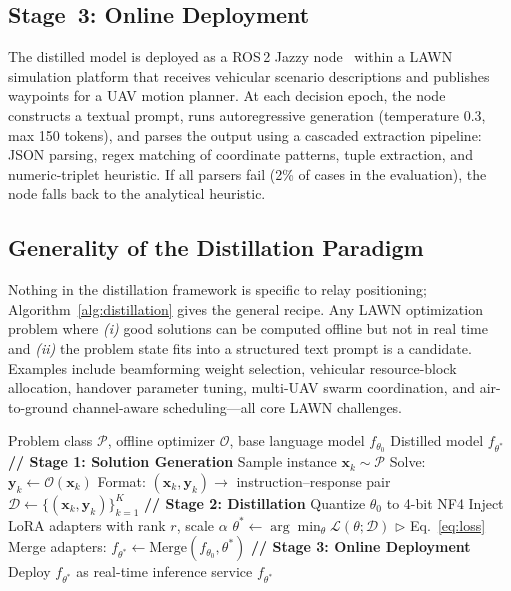 \documentclass[journal]{IEEEtran}
\begin{document}
\subsection{Stage~3: Online Deployment}

The distilled model is deployed as a ROS\,2 Jazzy node~\cite{macenski2022ros2} within a LAWN simulation platform that receives vehicular scenario descriptions and publishes waypoints for a UAV motion planner. At each decision epoch, the node constructs a textual prompt, runs autoregressive generation (temperature 0.3, max 150 tokens), and parses the output using a cascaded extraction pipeline: JSON parsing, regex matching of coordinate patterns, tuple extraction, and numeric-triplet heuristic. If all parsers fail (2\% of cases in the evaluation), the node falls back to the analytical heuristic.

\subsection{Generality of the Distillation Paradigm}

Nothing in the distillation framework is specific to relay positioning; Algorithm~\ref{alg:distillation} gives the general recipe. Any LAWN optimization problem where \emph{(i)} good solutions can be computed offline but not in real time and \emph{(ii)} the problem state fits into a structured text prompt is a candidate. Examples include beamforming weight selection, vehicular resource-block allocation, handover parameter tuning, multi-UAV swarm coordination, and air-to-ground channel-aware scheduling---all core LAWN challenges.

\begin{algorithm}[!t]
\caption{Optimizer Distillation for Real-Time Network Optimization}
\label{alg:distillation}
\begin{algorithmic}[1]
\renewcommand{\algorithmicrequire}{\textbf{Input:}}
\renewcommand{\algorithmicensure}{\textbf{Output:}}
\REQUIRE Problem class $\mathcal{P}$, offline optimizer $\mathcal{O}$, base language model $f_{\theta_0}$
\ENSURE Distilled model $f_{\theta^*}$
\STATE \textbf{// Stage 1: Solution Generation}
    \STATE Sample instance $\mathbf{x}_k \sim \mathcal{P}$
    \STATE Solve: $\mathbf{y}_k \leftarrow \mathcal{O}(\mathbf{x}_k)$
    \STATE Format: $(\mathbf{x}_k, \mathbf{y}_k) \rightarrow$ instruction--response pair
\ENDFOR
\STATE $\mathcal{D} \leftarrow \{(\mathbf{x}_k, \mathbf{y}_k)\}_{k=1}^{K}$
\STATE \textbf{// Stage 2: Distillation}
\STATE Quantize $\theta_0$ to 4-bit NF4
\STATE Inject LoRA adapters with rank $r$, scale $\alpha$
\STATE $\theta^* \leftarrow \arg\min_\theta \mathcal{L}(\theta; \mathcal{D})$ \hfill $\triangleright$ Eq.~\eqref{eq:loss}
\STATE Merge adapters: $f_{\theta^*} \leftarrow \text{Merge}(f_{\theta_0}, \theta^*)$
\STATE \textbf{// Stage 3: Online Deployment}
\STATE Deploy $f_{\theta^*}$ as real-time inference service
\RETURN $f_{\theta^*}$
\end{algorithmic}
\end{algorithm}
\end{document}
